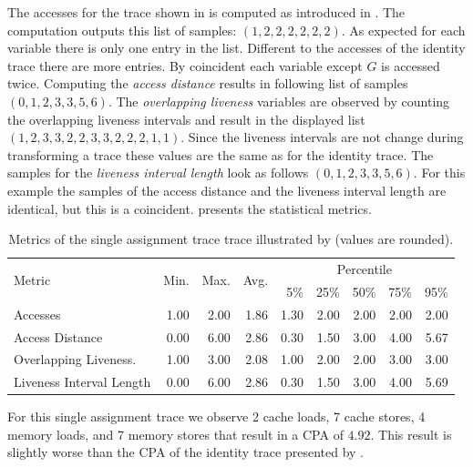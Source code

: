\documentclass[onecolumn, openright, master, english, signatures]{dbrgrptt}
\begin{document}
The accesses for the \ac{trace} shown in  is computed as introduced in .
The computation outputs this list of samples: $(1, 2, 2, 2, 2, 2, 2)$.
As expected for each variable there is only one entry in the list.
Different to the accesses of the identity \ac{trace} there are more entries.
By coincident each variable except $G$ is accessed twice.
Computing the \emph{access distance} results in following list of samples $(0, 1, 2, 3, 3, 5, 6)$.
The \emph{overlapping liveness} variables are observed by counting the overlapping liveness intervals and result in the displayed list $(1, 2, 3, 3, 2, 2, 3, 3, 2, 2, 2, 1, 1)$.
Since the liveness intervals are not change during transforming a \ac{trace} these values are the same as for the identity \ac{trace}.
The samples for the \emph{liveness interval length} look as follows $(0, 1, 2, 3, 3, 5, 6)$.
For this example the samples of the access distance and the liveness interval length are identical, but this is a coincident.
 presents the statistical metrics.

\begin{table}[!ht]
  \centering
  \begin{tabular}{lrrrrrrrr}
    \hline
    \multirow{2}{*}{Metric} & \multirow{2}{*}{Min.} & \multirow{2}{*}{Max.} & \multirow{2}{*}{Avg.} & \multicolumn{5}{c}{Percentile} \tabularnewline
    & & & & 5\% & 25\% & 50\% & 75\% & 95\% \tabularnewline
    \hline
    Accesses                 & 1.00 & 2.00 & 1.86 & 1.30 & 2.00 & 2.00 & 2.00 & 2.00 \\
    Access Distance          & 0.00 & 6.00 & 2.86 & 0.30 & 1.50 & 3.00 & 4.00 & 5.67 \\
    Overlapping Liveness.    & 1.00 & 3.00 & 2.08 & 1.00 & 2.00 & 2.00 & 3.00 & 3.00 \\
    Liveness Interval Length & 0.00 & 6.00 & 2.86 & 0.30 & 1.50 & 3.00 & 4.00 & 5.69 \\
    \hline
  \end{tabular}
  \caption{Metrics of the single assignment trace \ac{trace} illustrated by  (values are rounded).}
  \label{tab:summarizing-example-metrics-sa}
\end{table}

For this single assignment trace we observe 2 cache loads, 7 cache stores, 4 memory loads, and 7 memory stores that result in a \ac{CPA} of $4.92$.
This result is slightly worse than the \ac{CPA} of the identity \ac{trace} presented by .
\end{document}
